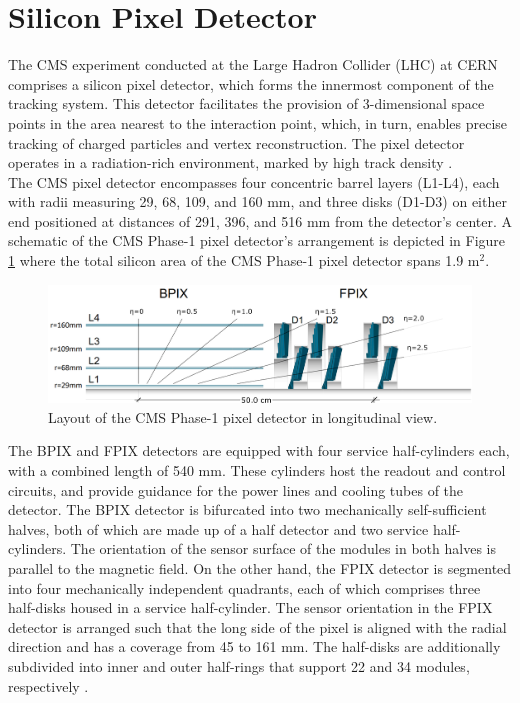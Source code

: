 \section{Silicon Pixel Detector}

The CMS experiment conducted at the Large Hadron Collider (LHC) at CERN comprises a silicon pixel detector, which forms the innermost component of the tracking system. This detector facilitates the provision of 3-dimensional space points in the area nearest to the interaction point, which, in turn, enables precise tracking of charged particles and vertex reconstruction. The pixel detector operates in a radiation-rich environment, marked by high track density \cite{phase1_Pixel_Detector}.\\

The CMS pixel detector encompasses four concentric barrel layers (L1-L4), each with radii measuring 29, 68, 109, and 160 mm, and three disks (D1-D3) on either end positioned at distances of 291, 396, and 516 mm from the detector's center. A schematic of the CMS Phase-1 pixel detector's arrangement is depicted in Figure \ref{phase1_pixel_detector} where the total silicon area of the CMS Phase-1 pixel detector spans 1.9 $\text{m}^{2}$.

\begin{center}
  \begin{figure}[h]
    \centering
    \includegraphics[scale=.26]{Chapter2/phase1_PixelDetector.png}
    \caption[CMS Phase-1 pixel detector]{Layout of the CMS Phase-1 pixel detector in longitudinal view\cite{phase1_Pixel_Detector}.}
    \label{phase1_pixel_detector}
  \end{figure}
\end{center}

The BPIX and FPIX detectors are equipped with four service half-cylinders each, with a combined length of 540 mm. These cylinders host the readout and control circuits, and provide guidance for the power lines and cooling tubes of the detector. The BPIX detector is bifurcated into two mechanically self-sufficient halves, both of which are made up of a half detector and two service half-cylinders. The orientation of the sensor surface of the modules in both halves is parallel to the magnetic field.
On the other hand, the FPIX detector is segmented into four mechanically independent quadrants, each of which comprises three half-disks housed in a service half-cylinder. The sensor orientation in the FPIX detector is arranged such that the long side of the pixel is aligned with the radial direction and has a coverage from 45 to 161 mm. The half-disks are additionally subdivided into inner and outer half-rings that support 22 and 34 modules, respectively \cite{phase1_Pixel_Detector}.\\

